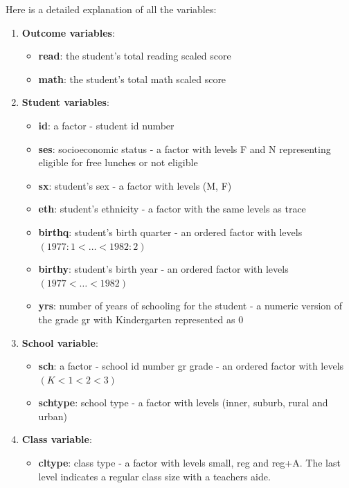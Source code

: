 \documentclass[11pt,a4paper]{article}
\begin{document}
Here is a detailed explanation of all the variables:

\begin{enumerate}[1]

    \item \textbf{Outcome variables}:
        \begin{itemize}
            \item \textbf{read}: the student’s total reading scaled score
            \item \textbf{math}: the student’s total math scaled score 
        \end{itemize}

	\item \textbf{Student variables}:
        \begin{itemize}
            \item \textbf{id}: a factor - student id number 
            \item \textbf{ses}: socioeconomic status - a factor with levels F and N representing eligible for free lunches or not eligible 
            \item \textbf{sx}: student’s sex - a factor with levels (M, F) 
            \item \textbf{eth}: student’s ethnicity - a factor with the same levels as trace 
            \item \textbf{birthq}: student’s birth quarter - an ordered factor with levels $(1977:1 < \dots < 1982:2)$
            \item \textbf{birthy}: student’s birth year - an ordered factor with levels $(1977 < \dots < 1982)$
            \item \textbf{yrs}: number of years of schooling for the student - a numeric version of the grade gr with Kindergarten 
            represented as 0
        \end{itemize}

    \item \textbf{School variable}:
        \begin{itemize}
            \item \textbf{sch}: a factor - school id number gr grade - an ordered factor with levels $(K < 1 < 2 < 3)$
            \item \textbf{schtype}: school type - a factor with levels (inner, suburb, rural and urban)
        \end{itemize}

    \item \textbf{Class variable}:
        \begin{itemize}
            \item \textbf{cltype}: class type - a factor with levels small, reg and reg+A. The last level indicates a regular class 
            size with a teachers aide.
        \end{itemize}


\end{enumerate}
\end{document}
